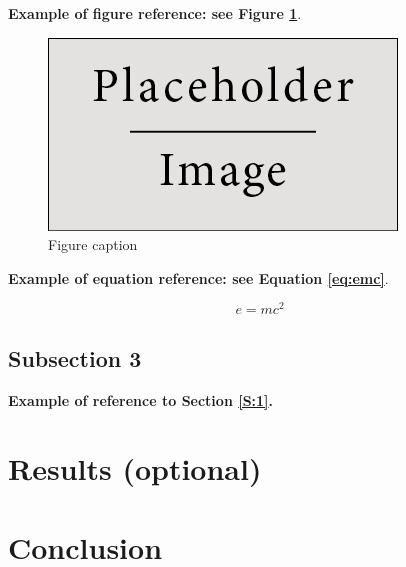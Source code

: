 \documentclass{article}
\begin{document}
        \textbf{Example of figure reference: see Figure \ref{fig:example}}. 
        \lipsum[5]

        \begin{figure}[H]
            \centering\includegraphics[width=0.4\linewidth]{figures/placeholder.jpg}
            \caption{Figure caption}
            \label{fig:example}
        \end{figure}

        \textbf{Example of equation reference: see Equation \eqref{eq:emc}}. 
        \lipsum[6]

        \begin{equation} 
            \label{eq:emc}
            e = mc^2
        \end{equation}

    \subsection{Subsection 3}

        \textbf{Example of reference to Section \ref{S:1}.} 
        \lipsum[7]
        \lipsum[8]



\section{Results (optional)}

    \lipsum[9]

\section{Conclusion}

    \lipsum[10]

{}

\end{document}
